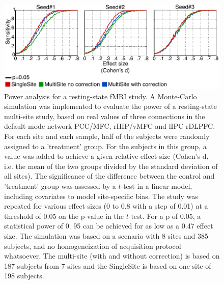 \documentclass[authoryear]{elsarticle}
\begin{document}
\begin{figure}[H]
\begin{center}
\includegraphics[width=\linewidth]{../figures/simu_results_multisite.pdf}
\end{center}
\caption[Detection power]{
Power analysis for a resting-state fMRI study. A Monte-Carlo simulation was implemented to evaluate the power of a resting-state multi-site study, based on real values of three connections in the default-mode network PCC/MFC, rHIP/vMFC and lIPC-rDLPFC. For each site and each sample, half of the subjects were randomly assigned to a 'treatment' group. For the subjects in this group, a value was added to achieve a given relative effect size (Cohen's d, i.e. the mean of the two groups divided by the standard deviation of all sites). The significance of the difference between the control and 'treatment' group was assessed by a $t$-test in a linear model, including covariates to model site-specific bias. The study was repeated for various effect sizes (0 to 0.8 with a step of 0.01) at a threshold of 0.05 on the p-value in the $t$-test. For a p of 0.05, a statistical power of 0.
95 can be achieved for as low as a 0.47 effect size. The simulation was based on a scenario with 8 sites and 385 subjects, and no homogeneization of acquisition protocol whatsoever. The multi-site (with and without correction) is based on 187 subjects from 7 sites and the SingleSite is based on one site of 198 subjects. 
}
\label{fig_detection_power}
\end{figure}
\end{document}
